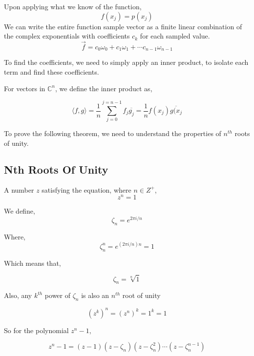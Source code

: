 \documentclass[twoside]{article}
\begin{document}
Upon applying what we know of the function,
\[
	f(x_j) = p(x_j)
\]
We can write the entire function sample vector as a finite linear combination of the complex exponentials with coefficients $c_k$ for each sampled value.
\[
	\vec{f} = c_0 \omega_0 + c_1 \omega_1 + \cdots c_{n-1} \omega_{n-1}
\]

To find the coefficients, we need to simply apply an inner product, to isolate each term and find these coefficients.

For vectors in $\mathbb{C}^n$, we define the inner product as,

\[
	\langle f,g \rangle = \frac{1}{n} \sum_{j = 0}^{j = n-1} f_j \overline{g_j} = \frac{1}{n} f(x_j) \overline{g(x_j}
\]

To prove the following theorem, we need to understand the properties of $n^{th}$ roots of unity.

\subsection{Nth Roots Of Unity}
\begin{definition}
A number $z$ satisfying the equation, where $n \in Z^+$,
\[
	z^n = 1
\]
\end{definition}
We define, 
\[
	\zeta_n = e^{2 \pi i/n}
\]

Where,
\[
	\zeta_n^n = e^{(2 \pi i / n)n} = 1
\]

Which means that,

\[
	\zeta_n = \sqrt[n]{1}
\]

Also, any $k^{th}$ power of $\zeta_n$ is also an $n^{th}$ root of unity

\[
	(z^k)^n = (z^n)^k = 1^k = 1
\]

So for the polynomial $z^n - 1$,

\[
		z^{n}-1 = (z-1)(z -  \zeta_n)(z-\zeta_n^2)\cdots(z - \zeta_n^{n-1}) 
\]
\end{document}

